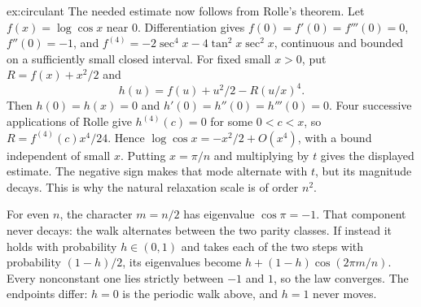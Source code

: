 \begin{solution}{ex:circulant}
The needed estimate now follows from Rolle's theorem.
Let $f(x)=\log\cos x$ near $0$. Differentiation gives
$f(0)=f'(0)=f'''(0)=0$, $f''(0)=-1$, and
$f^{(4)}=-2\sec^4x-4\tan^2x\sec^2x$, continuous and bounded on a sufficiently
small closed interval. For fixed small $x>0$, put
$R=f(x)+x^2/2$ and
\[
h(u)=f(u)+u^2/2-R(u/x)^4.
\]
Then $h(0)=h(x)=0$ and $h'(0)=h''(0)=h'''(0)=0$.
Four successive applications of Rolle give $h^{(4)}(c)=0$ for some
$0<c<x$, so $R=f^{(4)}(c)x^4/24$. Hence
$\log\cos x=-x^2/2+O(x^4)$, with a bound independent of small $x$.
Putting $x=\pi/n$ and multiplying by $t$ gives the displayed estimate.
The negative sign makes that mode alternate with $t$, but its magnitude decays. This is why the natural relaxation scale is of order $n^2$.

For even $n$, the character $m=n/2$ has eigenvalue $\cos\pi=-1$. That component never decays: the walk alternates between the two parity classes.
If instead it holds with probability $h\in(0,1)$ and takes each of the two steps
with probability $(1-h)/2$, its eigenvalues become
$h+(1-h)\cos(2\pi m/n)$. Every nonconstant one lies strictly between $-1$ and $1$,
so the law converges. The endpoints differ: $h=0$ is the periodic walk above,
and $h=1$ never moves.
\end{solution}

